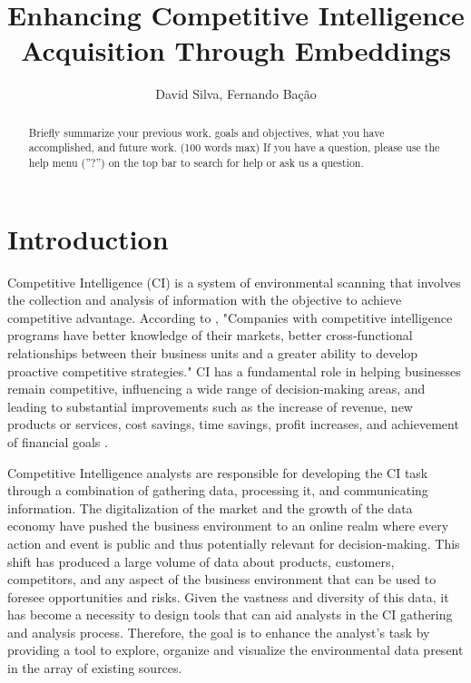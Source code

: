 \documentclass[a4paper]{article}
\title{Enhancing Competitive Intelligence Acquisition Through Embeddings}
\author{David Silva, Fernando Bação}
\date{}
\begin{document}
\maketitle

\begin{abstract}
	Briefly summarize your previous work, goals and objectives, what you have accomplished, and future work. (100 words max) If you have a question, please use the help menu (''?'') on the top bar to search for help or ask us a question.
\end{abstract}

\section*{Introduction}
Competitive Intelligence (CI) is a system of environmental scanning that involves the collection and analysis of information with the objective to achieve competitive advantage. According to \citet{brod1999}, "Companies with competitive intelligence programs have better knowledge of their markets, better cross-functional relationships between their business units and a greater ability to develop proactive competitive strategies." CI has a fundamental role in helping businesses remain competitive, influencing a wide range of decision-making areas, and leading to substantial improvements such as the increase of revenue, new products or services, cost savings, time savings, profit increases, and achievement of financial goals \citep{calof2017}.

Competitive Intelligence analysts are responsible for developing the CI task through a combination of gathering data, processing it, and communicating information. The digitalization of the market and the growth of the data economy have pushed the business environment to an online realm where every action and event is public and thus potentially relevant for decision-making. This shift has produced a large volume of data about products, customers, competitors, and any aspect of the business environment that can be used to foresee opportunities and risks. Given the vastness and diversity of this data, it has become a necessity to design tools that can aid analysts in the CI gathering and analysis process. Therefore, the goal is to enhance the analyst's task by providing a tool to explore, organize and visualize the environmental data present in the array of existing sources.
\end{document}
